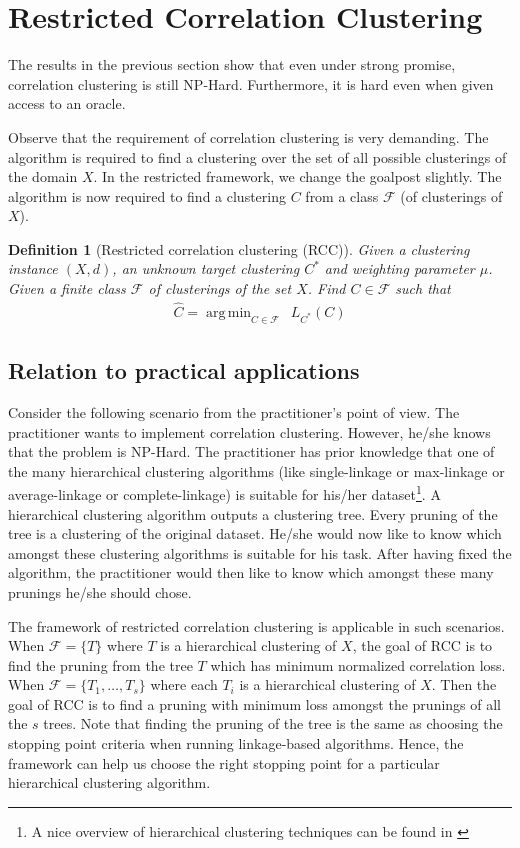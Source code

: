 \documentclass[12pt]{article}
\newtheorem{definition}[theorem]{Definition}
\newcommand{\mc}{\mathcal}
\DeclareMathOperator*{\argmin}{arg\,min}
\begin{document}
\fi

\section{Restricted Correlation Clustering}
\label{section:RCC}

The results in the previous section show that even under strong promise, correlation clustering is still NP-Hard. Furthermore, it is hard even when given access to an oracle. 

Observe that the requirement of correlation clustering is very demanding. The algorithm is required to find a clustering over the set of all possible clusterings of the domain $X$. In the restricted framework, we change the goalpost slightly. The algorithm is now required to find a clustering $C$ from a class $\mc F$ (of clusterings of $X$). 

\begin{definition}[Restricted correlation clustering (RCC)]
\label{defn:rcc}
Given a clustering instance $(X, d)$, an unknown target clustering $C^*$ and weighting parameter $\mu$. Given a finite class $\mc F$ of clusterings of the set $X$. Find $C \in \mc F$ such that 
\begin{align}
\hat C = \argmin_{C \in \mc F} \enspace L_{C^*}(C)\label{eqn:RCCMain}
\end{align}
\end{definition}

\subsection{Relation to practical applications}
Consider the following scenario from the practitioner's point of view. The practitioner wants to implement correlation clustering. However, he/she knows that the problem is NP-Hard. The practitioner has prior knowledge that one of the many hierarchical clustering algorithms (like single-linkage or max-linkage or average-linkage or complete-linkage) is suitable for his/her dataset\footnote{A nice overview of hierarchical clustering techniques can be found in \cite{maimon2009nhecd}}. A hierarchical clustering algorithm outputs a clustering tree. Every pruning of the tree is a clustering of the original dataset. He/she would now like to know which amongst these clustering algorithms is suitable for his task. After having fixed the algorithm, the practitioner would then  like to know which amongst these many prunings he/she should chose. 

The framework of restricted correlation clustering is applicable in such scenarios. When $\mc F = \{T\}$ where $T$ is a hierarchical clustering of $X$, the goal of RCC is to find the pruning from the tree $T$ which has minimum normalized correlation loss. When $\mc F = \{T_1, \ldots, T_s\}$ where each $T_i$ is a hierarchical clustering of $X$. Then the goal of RCC is to find a pruning with minimum loss amongst the prunings of all the $s$ trees. Note that finding the pruning of the tree is the same as choosing the stopping point criteria when running linkage-based algorithms. Hence, the framework can help us choose the right stopping point for a particular hierarchical clustering algorithm.
\end{document}
